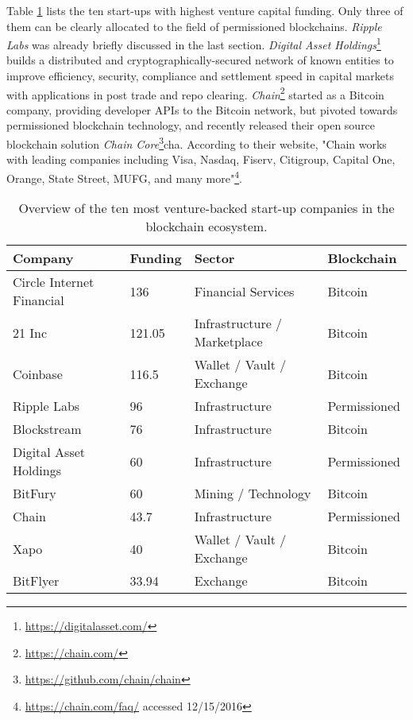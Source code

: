 Table \ref{tbl:eco:mostfunded} lists the ten start-ups with highest venture capital funding. Only three of them can be clearly allocated to the field of permissioned blockchains. \emph{Ripple Labs} was already briefly discussed in the last section. \emph{Digital Asset Holdings}\footnote{\url{https://digitalasset.com/}} builds a distributed and cryptographically-secured network of known entities to improve efficiency, security, compliance and settlement speed in capital markets with applications in post trade and repo clearing. \emph{Chain}\footnote{\url{https://chain.com/}} started as a Bitcoin company, providing developer \ac{API}s to the Bitcoin network, but pivoted towards permissioned blockchain technology, and recently released their open source blockchain solution \emph{Chain Core}\footnote{\url{https://github.com/chain/chain}}cha. According to their website, "Chain works with leading companies including Visa, Nasdaq, Fiserv, Citigroup, Capital One, Orange, State Street, MUFG, and many more"\footnote{\url{https://chain.com/faq/} accessed 12/15/2016}.

\begin{table}\footnotesize
  \centering
  \begin{tabularx}{\textwidth}{ l p{1.8cm} X l }
    \toprule
    \textbf{Company} & \textbf{Funding \newline [M USD]} & \textbf{Sector} & \textbf{Blockchain} \\
    \midrule
    Circle Internet Financial & 136 & Financial Services & Bitcoin \\
    21 Inc & 121.05 & Infrastructure / Marketplace & Bitcoin \\
    Coinbase & 116.5 & Wallet / Vault / Exchange & Bitcoin \\
    Ripple Labs & 96 & Infrastructure & Permissioned \\
    Blockstream & 76 & Infrastructure & Bitcoin \\
    Digital Asset Holdings & 60 & Infrastructure & Permissioned \\
    BitFury & 60 & Mining / Technology & Bitcoin \\
    Chain & 43.7 & Infrastructure & Permissioned \\
    Xapo & 40 & Wallet / Vault / Exchange & Bitcoin \\
    BitFlyer & 33.94 & Exchange & Bitcoin \\
    \bottomrule
  \end{tabularx}
  \caption{Overview of the ten most venture-backed start-up companies in the blockchain ecosystem.}
  \label{tbl:eco:mostfunded}
\end{table}


